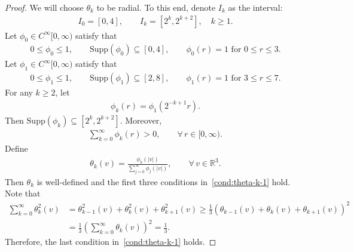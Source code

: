 \documentclass[11pt,american, reqno]{amsart}
\numberwithin{equation}{section}
\newcommand{\R}{\mathbb R}
\newcommand{\1}{\mathds{1}}
\newcommand{\vpran}[1]{\left(#1\right)}
\numberwithin{equation}{section}
\begin{document}
\begin{proof}
We will choose $\theta_k$ to be radial. To this end, denote $I_k$ as the interval:
\begin{align*}
 I_0 = [0, 4],
\qquad
I_k = [2^k, 2^{k+2}],
\quad
k \geq 1. 
\end{align*}
Let $\phi_0 \in C^\infty[0, \infty)$ satisfy that 
\begin{align*}
 0 \leq \phi_0 \leq 1,
\qquad
\text{Supp}(\phi_0) \subseteq [0, 4],
\qquad
\phi_0 (r) = 1 \,\, \text{for} \,\, 0 \leq r \leq 3.
\end{align*}
Let $\phi_1 \in C^\infty[0, \infty)$ satisfy that 
\begin{align*}
 0 \leq \phi_1 \leq 1,
\qquad
\text{Supp}(\phi_1) \subseteq [2, 8],
\qquad
\phi_1 (r) = 1 \,\, \text{for} \,\, 3 \leq r \leq 7.
\end{align*}
For any $k \geq 2$, let 
\begin{align*}
 \phi_k(r) = \phi_1(2^{-k+1} r). 
\end{align*}
Then $\text{Supp}(\phi_k) \subseteq [2^k, 2^{k+2}]$. Moreover, 
\begin{align*}
  \sum_{k=0}^\infty \phi_k(r)
> 0, 
\qquad 
\forall \, r \in [0, \infty).
\end{align*}
Define
\begin{align*}
 \theta_k(v)
= \frac{\phi_k(|v|)}{\sum_{j=0}^\infty \phi_j(|v|)},
\qquad  
 \forall \, v \in \R^3. 
\end{align*}
Then $\theta_k$ is well-defined and the first three conditions in~\eqref{cond:theta-k-1} hold. Note that
\begin{align*}
  \sum_{k=0}^\infty \theta_k^2(v)
&= \theta_{k-1}^2(v) + \theta_k^2(v)
  + \theta_{k+1}^2(v)
\geq 
 \frac{1}{3} \vpran{\theta_{k-1}(v) + \theta_k(v)
  + \theta_{k+1}(v)}^2
\\
&= \frac{1}{3} \vpran{\sum_{k=0}^\infty \theta_k(v)}^2
= \frac{1}{3}.
\end{align*}
Therefore, the last condition in~\eqref{cond:theta-k-1} holds. 


\end{proof}
\end{document}
